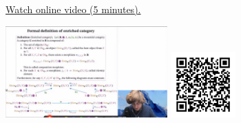 
\begin{minipage}{10cm}
    \href{https://act4e-spring21.netlify.app/videos/spring2021-enrichment:set-enriched.html}{Watch online video (5 minutes).}
        
    \href{https://act4e-spring21.netlify.app/videos/spring2021-enrichment:set-enriched.html}{\includegraphics[height=3.5cm]{spring2021-enrichment:set-enriched/thumbnails.jpg}}
    \href{https://act4e-spring21.netlify.app/videos/spring2021-enrichment:set-enriched.html}{\includegraphics[height=2.5cm]{spring2021-enrichment:set-enriched/qrcode.png}}
\end{minipage}

